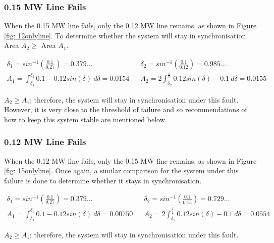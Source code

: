         \subsubsection*{0.15 MW Line Fails}
            When the 0.15 MW line fails, only the 0.12 MW line remains, as shown in Figure \ref{fig: 12onlyline}. To determine whether the system will stay in synchronisation Area \(A_2 \geq\) Area \(A_1\). 

            \vspace{-3mm}
    
            \begin{align}
                \delta_1 = sin^{-1}\left(\frac{0.1}{0.27}\right) = 0.379... && \delta_2 = sin^{-1}\left(\frac{0.1}{0.12}\right) = 0.985...\\
                A_1 = \int_{\delta_1}^{\delta_2}{0.1 - 0.12sin(\delta) \: d\delta} = 0.0154 && A_2 = 2\int_{\delta_2}^{\frac{\pi}{2}}{0.12sin(\delta) - 0.1 \: d\delta} = 0.0155
            \end{align}

            \(A_2 \geq A_1\); therefore, the system will stay in synchronisation under this fault. However, it is very close to the threshold of failure and so recommendations of how to keep this system stable are mentioned below.

        \subsubsection*{0.12 MW Line Fails}
            When the 0.12 MW line fails, only the 0.15 MW line remains, as shown in Figure \ref{fig: 15onlyline}. Once again, a similar comparison for the system under this failure is done to determine whether it stays in synchronisation. 
    
            \begin{align}
                \delta_1 = sin^{-1}\left(\frac{0.1}{0.27}\right) = 0.379... && \delta_2 = sin^{-1}\left(\frac{0.1}{0.15}\right) = 0.729...\\
                A_1 = \int_{\delta_1}^{\delta_2}{0.1 - 0.12sin(\delta) \: d\delta} = 0.00750 && A_2 = 2\int_{\delta_2}^{\frac{\pi}{2}}{0.12sin(\delta) - 0.1 \: d\delta} = 0.0554
            \end{align}

            \(A_2 \geq A_1\); therefore, the system will stay in synchronisation under this fault.

